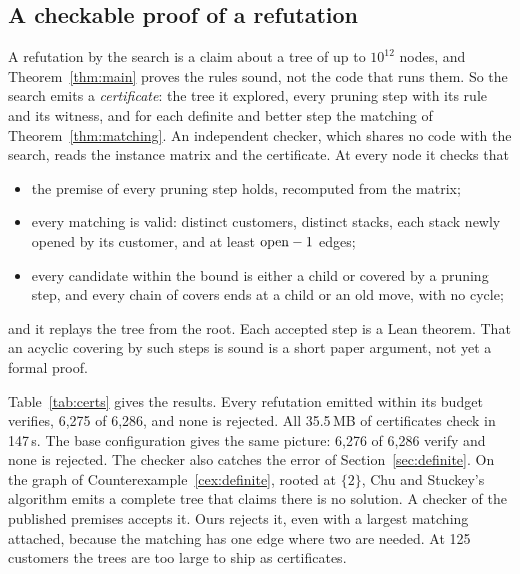 \subsection{A checkable proof of a refutation}
\label{sec:certs}

A refutation by the search is a claim about a tree of up to $10^{12}$ nodes,
and Theorem~\ref{thm:main} proves the rules sound, not the code that runs
them. So the search emits a \emph{certificate}: the tree it explored, every
pruning step with its rule and its witness, and for each definite and better
step the matching of Theorem~\ref{thm:matching}. An independent checker, which
shares no code with the search, reads the instance matrix and the certificate.
At every node it checks that
\begin{itemize}
\item the premise of every pruning step holds, recomputed from the matrix;
\item every matching is valid: distinct customers, distinct stacks, each stack
  newly opened by its customer, and at least $\mathrm{open}-1$ edges;
\item every candidate within the bound is either a child or covered by a
  pruning step, and every chain of covers ends at a child or an old move,
  with no cycle;
\end{itemize}
and it replays the tree from the root. Each accepted step is a Lean theorem.
That an acyclic covering by such steps is sound is a short paper argument, not
yet a formal proof.

\begin{table}[t]
\centering\small
\caption{Every certificate the search emitted verifies, none is rejected, and
checking takes milliseconds. Certificates for our corrected rules, configuration
with better move, refuting the optimum minus one on the certified MOSP corpus
at 9--75 customers, with 60\,s to emit each. \emph{Not emitted}: the emitter
did not finish in time. Size is the compressed certificate; check time is the
independent checker's.}
\label{tab:certs}
\resizebox{\linewidth}{!}{}
\end{table}

Table~\ref{tab:certs} gives the results. Every refutation emitted within its
budget verifies, 6,275 of 6,286, and none is rejected. All 35.5\,MB of
certificates check in 147\,s. The base configuration gives the same picture:
6,276 of 6,286 verify and none is rejected. The checker also catches the error
of Section~\ref{sec:definite}. On the graph of
Counterexample~\ref{cex:definite}, rooted at $\{2\}$, Chu and Stuckey's algorithm emits
a complete tree that claims there is no solution. A checker of the published
premises accepts it. Ours rejects it, even with a largest matching attached,
because the matching has one edge where two are needed. At 125 customers the
trees are too large to ship as certificates.

